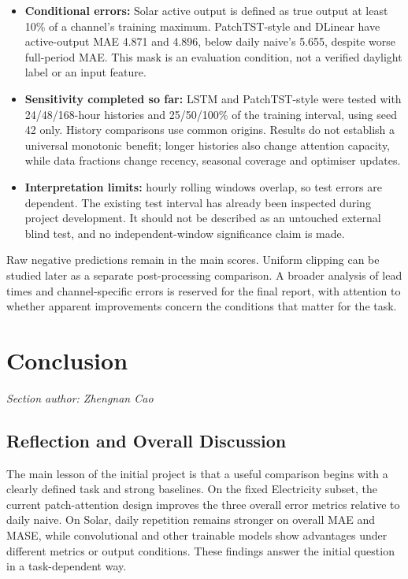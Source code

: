 \documentclass[11pt,a4paper]{article}
\newcommand{\sectionauthor}[1]{\noindent\textit{Section author: #1}\par\vspace{3pt}}
\begin{document}
\begin{itemize}
\item \textbf{Conditional errors:} Solar active output is defined as true output at least 10\% of a channel's training maximum. PatchTST-style and DLinear have active-output MAE 4.871 and 4.896, below daily naive's 5.655, despite worse full-period MAE. This mask is an evaluation condition, not a verified daylight label or an input feature.
\item \textbf{Sensitivity completed so far:} LSTM and PatchTST-style were tested with 24/48/168-hour histories and 25/50/100\% of the training interval, using seed 42 only. History comparisons use common origins. Results do not establish a universal monotonic benefit; longer histories also change attention capacity, while data fractions change recency, seasonal coverage and optimiser updates.
\item \textbf{Interpretation limits:} hourly rolling windows overlap, so test errors are dependent. The existing test interval has already been inspected during project development. It should not be described as an untouched external blind test, and no independent-window significance claim is made.
\end{itemize}
Raw negative predictions remain in the main scores. Uniform clipping can be studied later as a separate post-processing comparison. A broader analysis of lead times and channel-specific errors is reserved for the final report, with attention to whether apparent improvements concern the conditions that matter for the task.

\FloatBarrier
\section{Conclusion}\label{sec:conclusion}
\sectionauthor{Zhengnan Cao}
\subsection{Reflection and Overall Discussion}
The main lesson of the initial project is that a useful comparison begins with a clearly defined task and strong baselines. On the fixed Electricity subset, the current patch-attention design improves the three overall error metrics relative to daily naive. On Solar, daily repetition remains stronger on overall MAE and MASE, while convolutional and other trainable models show advantages under different metrics or output conditions. These findings answer the initial question in a task-dependent way.
\end{document}
